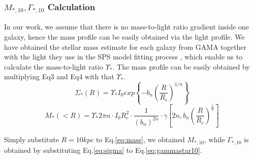 \documentclass[fleqn,usenatbib]{mnras}
\begin{document}
\subsubsection{$M_{*,10}, \Gamma_{*,10}$ Calculation}
\label{sec:cal}
In our work, we assume that there is no mass-to-light ratio gradient inside one galaxy, hence the mass profile can be easily obtained via the light profile. We have obtained the stellar mass estimate for each galaxy from GAMA together with the light they use in the SPS model fitting process \citep{GAMAmain}, which enable us to calculate the mass-to-light ratio $\Upsilon_*$. The mass profile can be easily obtained by multiplying Eq3 and Eq4 with that $\Upsilon_*$.
\begin{equation}
    \label{eq:sigma}
    \Sigma_*(R) = \Upsilon_* I_0 exp\left\{-b_n\left(\frac{R}{R_e}\right)^{1/n}\right\} 
\end{equation}
\begin{equation}
    \label{eq:mass}
    M_*(<R) = \Upsilon_* 2\pi n\cdot I_0R_e^2 \cdot \frac{1}{\left(b_n\right)^{2n}}\cdot \gamma\left[2n,b_n \left(\frac{R}{R_e}\right)^{\frac{1}{n}}\right]
\end{equation}
\par Simply substitute $R = 10kpc$ to Eq.\ref{eq:mass}, we obtained $M_{*,10}$, while $\Gamma_{*,10}$ is obtained by substituting Eq.\ref{eq:sigma} to Eq.\ref{eq:gammastar10}. 
\end{document}
